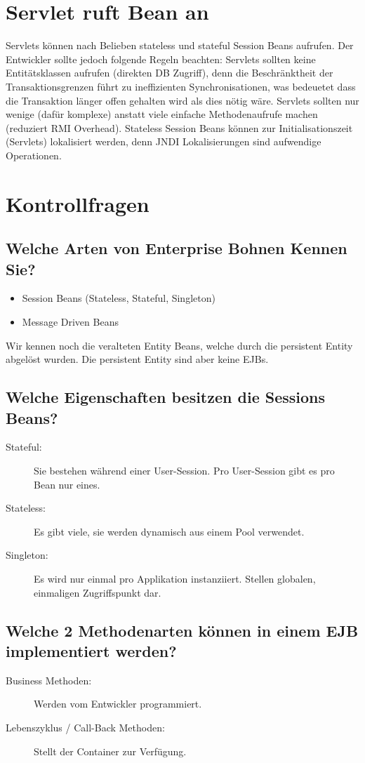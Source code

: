 \section{Servlet ruft Bean an}
Servlets können nach Belieben stateless und stateful Session Beans aufrufen. Der Entwickler sollte jedoch folgende Regeln beachten: Servlets sollten keine Entitätsklassen aufrufen (direkten DB Zugriff), denn die Beschränktheit der Transaktionsgrenzen führt zu ineffizienten Synchronisationen, was bedeuetet dass die Transaktion länger offen gehalten wird als dies nötig wäre. Servlets sollten nur wenige (dafür komplexe) anstatt viele einfache Methodenaufrufe machen (reduziert RMI Overhead). Stateless Session Beans können zur Initialisationszeit (Servlets) lokalisiert werden, denn JNDI Lokalisierungen sind aufwendige Operationen.

\section{Kontrollfragen}

\subsection{Welche Arten von Enterprise Bohnen Kennen Sie?}
\begin{itemize}
	\item Session Beans (Stateless, Stateful, Singleton)
	\item Message Driven Beans
\end{itemize}
Wir kennen noch die veralteten Entity Beans, welche durch die persistent Entity abgelöst wurden. Die persistent Entity sind aber keine EJBs.

\subsection{Welche Eigenschaften besitzen die Sessions Beans?}
\begin{description}
	\item[Stateful:] Sie bestehen während einer User-Session. Pro User-Session gibt es pro Bean nur eines.
	\item[Stateless:] Es gibt viele, sie werden dynamisch aus einem Pool verwendet.
	\item[Singleton:] Es wird nur einmal pro Applikation instanziiert. Stellen globalen, einmaligen Zugriffspunkt dar.
\end{description}

\subsection{Welche 2 Methodenarten können in einem EJB implementiert werden?}
\begin{description}
	\item[Business Methoden:] Werden vom Entwickler programmiert.
	\item[Lebenszyklus / Call-Back Methoden:] Stellt der Container zur Verfügung. 
\end{description}


